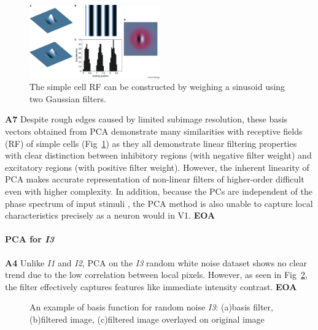 \documentclass[11pt, twocolumn]{article}
\begin{document}
\begin{figure}[ht]
    \centering
    \includegraphics[width=0.5\textwidth]{7-2.jpg}
    \caption{The simple cell RF can be constructed by weighing a sinusoid using two Gaussian filters. \cite{lennie_2003_receptive}}
    \label{fig:6}
\end{figure}


\textbf{A7} Despite rough edges caused by limited subimage resolution, these basis vectors obtained from PCA demonstrate many similarities with receptive fields (RF) of simple cells (Fig~\ref{fig:6}) as they all demonstrate linear filtering properties with clear distinction between inhibitory regions (with negative filter weight) and excitatory regions (with positive filter weight).
However, the inherent linearity of PCA makes accurate representation of non-linear filters of higher-order difficult even with higher complexity. In addition, because the PCs are independent of the phase spectrum of input stimuli \cite{field_1994_what}, the PCA method is also unable to capture local characteristics precisely as a neuron would in V1. \textbf{EOA}

\paragraph{PCA for \textit{I3}}

\textbf{A4} Unlike \textit{I1} and \textit{I2}, PCA on the \textit{I3} random white noise dataset shows no clear trend due to the low correlation between local pixels. However, as seen in Fig~\ref{fig:4}, the filter effectively captures features like immediate intensity contrast. \textbf{EOA}
\begin{figure}[ht]
    \centering
    \caption{An example of basis function for random noise \textit{I3}: (a)basis filter, (b)filtered image, (c)filtered image overlayed on original image}
    \label{fig:4}
\end{figure}
\end{document}

